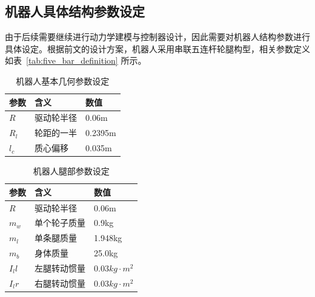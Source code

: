 \subsection{机器人具体结构参数设定}
由于后续需要继续进行动力学建模与控制器设计，因此需要对机器人结构参数进行具体设定。根据前文的设计方案，机器人采用串联五连杆轮腿构型，相关参数定义如表~\ref{tab:five_bar_definition} 所示。

\begin{table}[htbp]
  \centering
  \caption{机器人基本几何参数设定}\label{tab:geometry_params}
  \renewcommand{\arraystretch}{1.3}
  \begin{tabularx}{\textwidth}{>{\centering\arraybackslash}X >{\centering\arraybackslash}X >{\centering\arraybackslash}X}
    \toprule
    \textbf{参数} & \textbf{含义} & \textbf{数值} \\
    \midrule
    $R$ & 驱动轮半径 & 0.06m \\
    $R_l$ & 轮距的一半 & 0.2395m \\
    $l_c$ & 质心偏移 & 0.035m \\
    \bottomrule
  \end{tabularx}
\end{table}

\begin{table}[H]
  \centering
  \caption{机器人腿部参数设定}\label{tab:leg_params}
  \renewcommand{\arraystretch}{1.3}
  \begin{tabularx}{\textwidth}{>{\centering\arraybackslash}X >{\centering\arraybackslash}X >{\centering\arraybackslash}X}
    \toprule
    \textbf{参数} & \textbf{含义} & \textbf{数值} \\
    \midrule
    $R$ & 驱动轮半径 & 0.06m \\
    $m_w$ & 单个轮子质量 & 0.9kg \\
    $m_l$ & 单条腿质量 & 1.948kg \\
    $m_b$ & 身体质量 & 25.0kg \\
    $I_ll$ & 左腿转动惯量 &$0.03kg\cdot m^2$\\
    $I_lr$ & 右腿转动惯量 &$0.03kg\cdot m^2$\\
    \bottomrule
  \end{tabularx}
\end{table}
